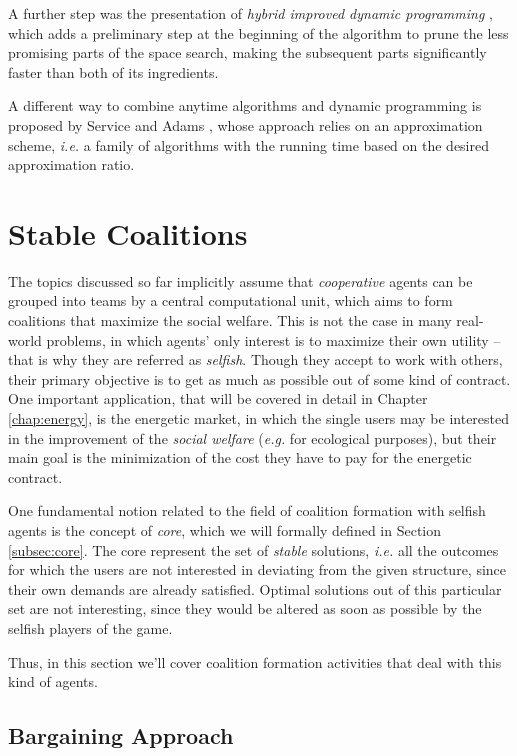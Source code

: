 \documentclass[11pt, twoside, titlepage, a4paper, openright]{report}
\begin{document}
\noindent A further step was the presentation of \textit{hybrid improved dynamic programming} \cite{Rahwan_Jennings_2008}, which adds a preliminary step at the beginning of the algorithm to prune the less promising parts of the space search, making the subsequent parts significantly faster than both of its ingredients.

A different way to combine anytime algorithms and dynamic programming is proposed by Service and Adams \cite{ServiceAdams10b}, whose approach relies on an approximation scheme, \textit{i.e.} a family of algorithms with the running time based on the desired approximation ratio.

\section{Stable Coalitions}

The topics discussed so far implicitly assume that \textit{cooperative} agents can be grouped into teams by a central computational unit, which aims to form coalitions that maximize the social welfare. This is not the case in many real-world problems, in which agents' only interest is to maximize their own utility -- that is why they are referred as \textit{selfish}. Though they accept to work with others, their primary objective is to get as much as possible out of some kind of contract. One important application, that will be covered in detail in Chapter \ref{chap:energy}, is the energetic market, in which the single users may be interested in the improvement of the \textit{social welfare} (\textit{e.g.} for ecological purposes), but their main goal is the minimization of the cost they have to pay for the energetic contract.

One fundamental notion related to the field of coalition formation with selfish agents is the concept of \textit{core}, which we will formally defined in Section \ref{subsec:core}. The core represent the set of \textit{stable} solutions, \textit{i.e.} all the outcomes for which the users are not interested in deviating from the given structure, since their own demands are already satisfied. Optimal solutions out of this particular set are not interesting, since they would be altered as soon as possible by the selfish players of the game.

Thus, in this section we'll cover coalition formation activities that deal with this kind of agents.

\subsection{Bargaining Approach}
\end{document}
